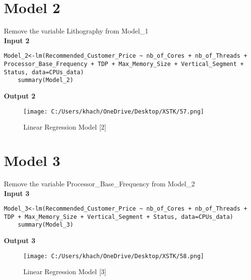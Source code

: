\documentclass[a4paper]{article}
\begin{document}
	\section*{Model 2}
	Remove the variable Lithography from Model\_1\\
	\textbf{Input 2}
	\begin{lstlisting}[frame=single, backgroundcolor=\color{gray!10}, breaklines=true, columns=fullflexible]
	Model_2<-lm(Recommended_Customer_Price ~ nb_of_Cores + nb_of_Threads + Processor_Base_Frequency + TDP + Max_Memory_Size + Vertical_Segment + Status, data=CPUs_data)
	summary(Model_2)
	\end{lstlisting}
	\textbf{Output 2}
	\begin{figure}[htbp]
		\centering
		\begin{adjustbox}{width=0.7\textwidth, frame}
			\texttt{[image: C:/Users/khach/OneDrive/Desktop/XSTK/57.png]}
		\end{adjustbox}
		\captionsetup{justification=centering}
		\vspace{0.5cm}
		\caption{Linear Regression Model [2]}
	\end{figure}
	\section*{Model 3}
	Remove the variable Processor\_Base\_Frequency from Model\_2\\
	\textbf{Input 3}
	\begin{lstlisting}[frame=single, backgroundcolor=\color{gray!10}, breaklines=true, columns=fullflexible]
	Model_3<-lm(Recommended_Customer_Price ~ nb_of_Cores + nb_of_Threads + TDP + Max_Memory_Size + Vertical_Segment + Status, data=CPUs_data)
	summary(Model_3)
	\end{lstlisting}
	\textbf{Output 3}
	\begin{figure}[htbp]
		\centering
		\begin{adjustbox}{width=0.7\textwidth, frame}
			\texttt{[image: C:/Users/khach/OneDrive/Desktop/XSTK/58.png]}
		\end{adjustbox}
		\captionsetup{justification=centering}
		\vspace{0.5cm}
		\caption{Linear Regression Model [3]}
	\end{figure}
\end{document}
